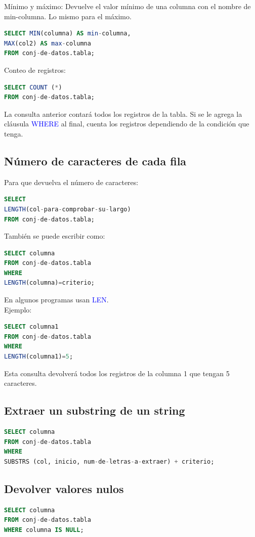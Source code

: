 \documentclass[a4paper, 12pt]{book}
\begin{document}
Mínimo y máximo: Devuelve el valor mínimo de una columna con el nombre de min-columna. Lo mismo para el máximo.
\begin{lstlisting}[language=SQL]
SELECT MIN(columna) AS min-columna,
MAX(col2) AS max-columna
FROM conj-de-datos.tabla;
\end{lstlisting}


Conteo de registros:
\begin{lstlisting}[language=SQL]
SELECT COUNT (*)
FROM conj-de-datos.tabla;
\end{lstlisting}
La consulta anterior contará todos los registros de la tabla. Si se le agrega la cláusula \textcolor{blue}{WHERE} al final, cuenta los registros dependiendo de la condición que tenga.
\subsection{Número de caracteres de cada fila}
Para que devuelva el número de caracteres:
\begin{lstlisting}[language=SQL]
SELECT
LENGTH(col-para-comprobar-su-largo)
FROM conj-de-datos.tabla;
\end{lstlisting}
También se puede escribir como:
\begin{lstlisting}[language=SQL]
SELECT columna
FROM conj-de-datos.tabla
WHERE
LENGTH(columna)=criterio;
\end{lstlisting}
En algunos programas usan \textcolor{blue}{LEN}. \\
Ejemplo:
\begin{lstlisting}[language=SQL]
SELECT columna1
FROM conj-de-datos.tabla
WHERE
LENGTH(columna1)=5;
\end{lstlisting}
Esta consulta devolverá todos los registros de la columna 1 que tengan 5 caracteres.
\subsection{Extraer un substring de un string}
\begin{lstlisting}[language=SQL]
SELECT columna
FROM conj-de-datos.tabla
WHERE
SUBSTRS (col, inicio, num-de-letras-a-extraer) + criterio;
\end{lstlisting}
\subsection{Devolver valores nulos}
\begin{lstlisting}[language=SQL]
SELECT columna
FROM conj-de-datos.tabla
WHERE columna IS NULL;
\end{lstlisting}
\end{document}
